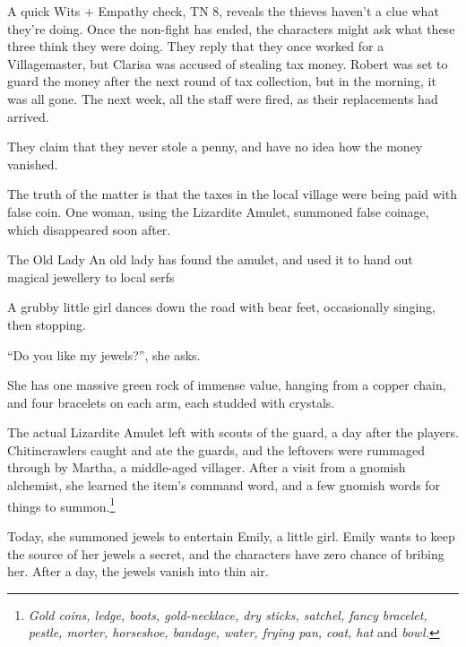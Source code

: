 \begin{multicols}{2}
A quick Wits + Empathy check, TN 8, reveals the thieves haven't a clue what they're doing.
Once the non-fight has ended, the characters might ask what these three think they were doing.
They reply that they once worked for a Villagemaster, but Clarisa was accused of stealing tax money.
Robert was set to guard the money after the next round of tax collection, but in the morning, it was all gone.
The next week, all the staff were fired, as their replacements had arrived.

They claim that they never stole a penny, and have no idea how the money vanished.

The truth of the matter is that the taxes in the local village were being paid with false coin.
One woman, using the Lizardite Amulet, summoned false coinage, which disappeared soon after.



{The Old Lady}%
{An old lady has found the amulet, and used it to hand out magical jewellery to local serfs}%

\begin{boxtext}
  A grubby little girl dances down the road with bear feet, occasionally singing, then stopping.

    ``Do you like my jewels?'', she asks.

  She has one massive green rock of immense value, hanging from a copper chain, and four bracelets on each arm, each studded with crystals.
\end{boxtext}

The actual Lizardite Amulet left with scouts of the \gls{guard}, a day after the players.
Chitincrawlers caught and ate the guards, and the leftovers were rummaged through by Martha, a middle-aged villager.
After a visit from a gnomish alchemist, she learned the item's command word, and a few gnomish words for things to summon.\footnote
{\textit{Gold coins, ledge, boots, gold-necklace, dry sticks, satchel, fancy bracelet, pestle, morter, horseshoe, bandage, water, frying pan, coat, hat} and \textit{bowl.}}

Today, she summoned jewels to entertain Emily, a little girl.
Emily wants to keep the source of her jewels a secret, and the characters have zero chance of bribing her.
After a day, the jewels vanish into thin air.



\end{multicols}
